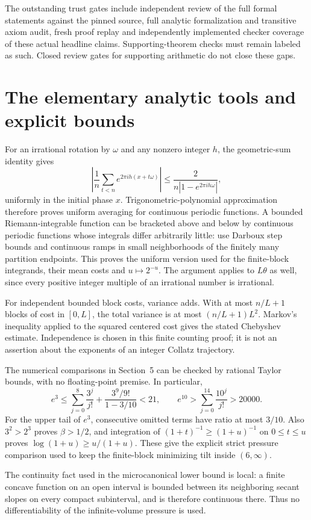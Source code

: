 \documentclass[11pt,letterpaper]{article}
\begin{document}
The outstanding trust gates include independent review of the full formal statements against the pinned source, full analytic formalization and transitive axiom audit, fresh proof replay and independently implemented checker coverage of these actual headline claims. Supporting-theorem checks must remain labeled as such. Closed review gates for supporting arithmetic do not close these gaps.

\appendix
\section{The elementary analytic tools and explicit bounds}
For an irrational rotation by $\omega$ and any nonzero integer $h$, the
geometric-sum identity gives
\[
\left|\frac1n\sum_{t<n}e^{2\pi ih(x+t\omega)}\right|
 \le \frac{2}{n|1-e^{2\pi ih\omega}|},
\]
uniformly in the initial phase $x$. Trigonometric-polynomial approximation
therefore proves uniform averaging for continuous periodic functions.
A bounded Riemann-integrable function can be bracketed above and below by
continuous periodic functions whose integrals differ arbitrarily little:
use Darboux step bounds and continuous ramps in small neighborhoods of the
finitely many partition endpoints. This proves the uniform version used
for the finite-block integrands, their mean costs and $u\mapsto2^{-u}$.
The argument applies to $L\theta$ as well, since every positive integer
multiple of an irrational number is irrational.

For independent bounded block costs, variance adds. With at most $n/L+1$
blocks of cost in $[0,L]$, the total variance is at most $(n/L+1)L^2$.
Markov's inequality applied to the squared centered cost gives the stated
Chebyshev estimate. Independence is chosen in this finite counting proof;
it is not an assertion about the exponents of an integer Collatz trajectory.

The numerical comparisons in Section~5 can be checked by rational Taylor
bounds, with no floating-point premise. In particular,
\[
 e^3\le\sum_{j=0}^{8}\frac{3^j}{j!}
       +\frac{3^9/9!}{1-3/10}<21,
 \qquad
 e^{10}>\sum_{j=0}^{14}\frac{10^j}{j!}>20000.
\]
For the upper tail of $e^3$, consecutive omitted terms have ratio at most
$3/10$. Also $3^2>2^3$ proves $\beta>1/2$, and integration of
$(1+t)^{-1}\ge(1+u)^{-1}$ on $0\le t\le u$ proves
$\log(1+u)\ge u/(1+u)$. These give the explicit strict pressure comparison
used to keep the finite-block minimizing tilt inside $(6,\infty)$.

The continuity fact used in the microcanonical lower bound is local: a finite
concave function on an open interval is bounded between its neighboring secant
slopes on every compact subinterval, and is therefore continuous there. Thus
no differentiability of the infinite-volume pressure is used.
\end{document}
